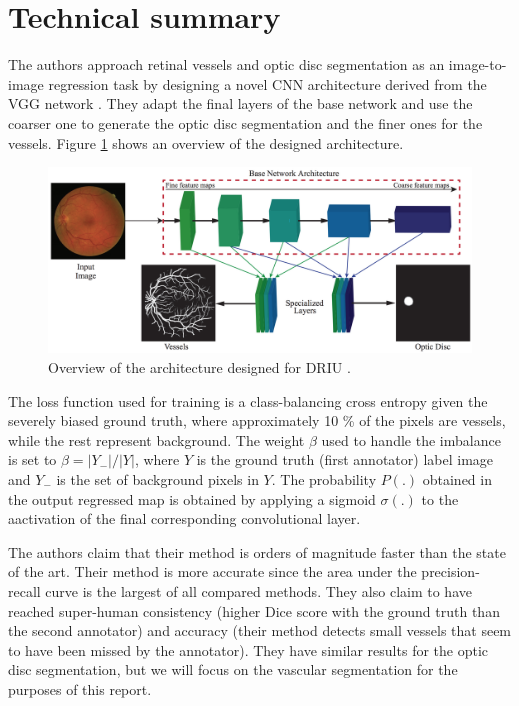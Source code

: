 \section{Technical summary}


The authors approach retinal vessels and optic disc segmentation as an image-to-image regression task by designing a novel CNN architecture derived from the VGG network \cite{simonyan_very_2014}. They adapt the final layers of the base network and use the coarser one to generate the optic disc segmentation and the finer ones for the vessels. Figure \ref{fig:driu} shows an overview of the designed architecture.

\begin{figure}
  \includegraphics[width=\textwidth]{figures/driu}
  \caption{Overview of the architecture designed for DRIU \cite{maninis_deep_2016}.} \label{fig:driu}
\end{figure}

The loss function used for training is a class-balancing cross entropy given the severely biased ground truth, where approximately 10 \% of the pixels are vessels, while the rest represent background. The weight $\beta$ used to handle the imbalance is set to $\beta = |Y_-| / |Y|$, where $Y$ is the ground truth (first annotator) label image and $Y_-$ is the set of background pixels in $Y$. The probability $P(.)$ obtained in the output regressed map is obtained by applying a sigmoid $\sigma(.)$ to the aactivation of the final corresponding convolutional layer.

The authors claim that their method is orders of magnitude faster than the state of the art. Their method is more accurate since the area under the precision-recall curve is the largest of all compared methods. They also claim to have reached super-human consistency (higher Dice score with the ground truth than the second annotator) and accuracy (their method detects small vessels that seem to have been missed by the annotator). They have similar results for the optic disc segmentation, but we will focus on the vascular segmentation for the purposes of this report.
